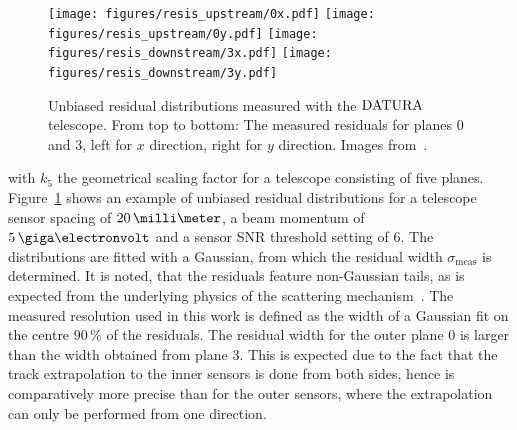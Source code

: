 \begin{figure}[tb]
  \centering
  \texttt{[image: figures/resis\_upstream/0x.pdf]}
  \texttt{[image: figures/resis\_upstream/0y.pdf]}
  \texttt{[image: figures/resis\_downstream/3x.pdf]}
  \texttt{[image: figures/resis\_downstream/3y.pdf]}
  \caption[Residual examples to determine the $\Datura$ telescope's resolution~\cite{ref:thomas}]{Unbiased residual distributions measured with the $\Datura$ telescope.
From top to bottom: The measured residuals for planes $0$ and $3$, left for $x$ direction, right for $y$ direction.
Images from~\cite{ref:thomas}.}
  \label{fig:residualexample1}
\end{figure}

with $k_5$ the geometrical scaling factor for a telescope consisting of five planes.
Figure~\ref{fig:residualexample1} shows an example of unbiased residual distributions for a telescope sensor spacing of $20\,\milli\meter$,
 a beam momentum of $5\,\giga\electronvolt$ and a sensor SNR threshold setting of $6$.
The distributions are fitted with a Gaussian, from which the residual width $\sigma_{\textrm{meas}}$ is determined.
It is noted, that the residuals feature non-Gaussian tails, as is expected from the underlying physics of the scattering mechanism~\cite{ref:PDG-2014}. 
The measured resolution used in this work is defined as the width of a Gaussian fit on the centre $90\,\%$ of the residuals. 
The residual width for the outer plane $0$ is larger than the width obtained from plane $3$.
This is expected due to the fact that the track extrapolation to the inner sensors is done from both sides, hence is comparatively more precise than for the outer sensors, where the extrapolation can only be performed from one direction. 






% 

